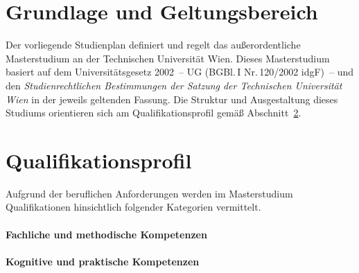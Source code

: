 
\newcommand*\Markierung{Lehrgang}
\newcommand*\Studienart{außerordentliche Masterstudium}
\newcommand*\ArtikelAkkusativStudienart{das}


\DECKBLATT

\tableofcontents
\clearpage

\section{Grundlage und Geltungsbereich}\label{sec:GG}

Der vorliegende Studienplan definiert und regelt das
außerordentliche Masterstudium \emph{} 
an der Technischen Universität Wien. 
Dieses Masterstudium basiert auf dem Universitätsgesetz 
2002~-- UG (BGBl.\,I Nr.\,120/2002 idgF)~-- und den 
\emph{Studienrechtlichen Bestimmungen der Satzung der 
Technischen Universität Wien} in der jeweils geltenden Fassung. 
Die Struktur und Ausgestaltung dieses Studiums orientieren
sich am Qualifikationsprofil gemäß Abschnitt~\ref{sec:QP}.

\section{Qualifikationsprofil}\label{sec:QP}

\newcommand*\QPIntro{%
Das außerordentliche Masterstudium \emph{\VAR{Titel}} vermittelt eine vertiefte, 
wissenschaftlich und methodisch hochwertige, auf dauerhaftes Wissen ausgerichtete 
Bildung, welche die Absolvent\_innen höher qualifiziert  sowie für eine Beschäftigung 
in beispielsweise folgenden Tätigkeitsbereichen befähigt und 
international konkurrenzfähig macht:
%
}


%

Aufgrund der beruflichen Anforderungen werden im Masterstudium
\emph{} Qualifikationen hinsichtlich folgender Kategorien
vermittelt.

\paragraph{Fachliche und methodische Kompetenzen}

\paragraph{Kognitive und praktische Kompetenzen}

